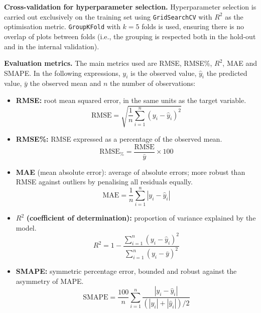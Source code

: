 \noindent\textbf{Cross-validation for hyperparameter selection.} Hyperparameter selection is carried out exclusively on the training set using \texttt{GridSearchCV} with $R^2$ as the optimisation metric. \texttt{GroupKFold} with $k=5$ folds is used, ensuring there is no overlap of plots between folds (i.e., the grouping is respected both in the hold-out and in the internal validation).

\vspace{0.25em}
\vspace{0.25em}
\noindent\textbf{Evaluation metrics.} The main metrics used are RMSE, RMSE\%, $R^2$, MAE and SMAPE. In the following expressions, $y_i$ is the observed value, $\hat{y}_i$ the predicted value, $\bar{y}$ the observed mean and $n$ the number of observations:

\begin{itemize}
    \item \textbf{RMSE:} root mean squared error, in the same units as the target variable.
          \begin{equation}
              \text{RMSE} = \sqrt{\frac{1}{n} \sum_{i=1}^{n} (y_i - \hat{y}_i)^2}
          \end{equation}

    \item \textbf{RMSE\%:} RMSE expressed as a percentage of the observed mean.
          \begin{equation}
              \text{RMSE}_{\%} = \frac{\text{RMSE}}{\bar{y}} \times 100
          \end{equation}

    \item \textbf{MAE} (mean absolute error): average of absolute errors; more robust than RMSE against outliers by penalising all residuals equally.
          \begin{equation}
              \text{MAE} = \frac{1}{n} \sum_{i=1}^{n} |y_i - \hat{y}_i|
          \end{equation}

    \item \boldmath\textbf{$R^2$}\unboldmath{} \textbf{(coefficient of determination):} proportion of variance explained by the model.
          \begin{equation}
              R^2 = 1 - \frac{\sum_{i=1}^{n} (y_i - \hat{y}_i)^2}{\sum_{i=1}^{n} (y_i - \bar{y})^2}
          \end{equation}

    \item \textbf{SMAPE:} symmetric percentage error, bounded and robust against the asymmetry of MAPE.
          \begin{equation}
              \text{SMAPE} = \frac{100}{n} \sum_{i=1}^{n} \frac{|y_i - \hat{y}_i|}{(|y_i| + |\hat{y}_i|)/2}
          \end{equation}
\end{itemize}

